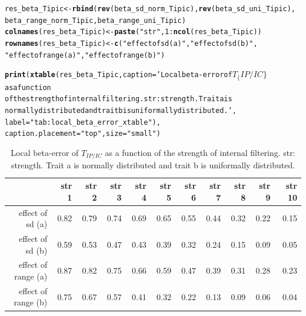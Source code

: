 \documentclass[12pt]{article}\usepackage[]{graphicx}\usepackage[]{color}
\makeatletter
\newcommand{\hlnum}[1]{\textcolor[rgb]{0.686,0.059,0.569}{#1}}%
\newcommand{\hlstr}[1]{\textcolor[rgb]{0.192,0.494,0.8}{#1}}%
\newcommand{\hlopt}[1]{\textcolor[rgb]{0,0,0}{#1}}%
\newcommand{\hlstd}[1]{\textcolor[rgb]{0.345,0.345,0.345}{#1}}%
\newcommand{\hlkwb}[1]{\textcolor[rgb]{0.69,0.353,0.396}{#1}}%
\newcommand{\hlkwc}[1]{\textcolor[rgb]{0.333,0.667,0.333}{#1}}%
\newcommand{\hlkwd}[1]{\textcolor[rgb]{0.737,0.353,0.396}{\textbf{#1}}}%
\newenvironment{kframe}{%
 \def\at@end@of@kframe{}%
 \ifinner\ifhmode%
  \def\at@end@of@kframe{\end{minipage}}%
  \begin{minipage}{\columnwidth}%
 \fi\fi%
 \def\FrameCommand##1{\hskip\@totalleftmargin \hskip-\fboxsep
 \colorbox{shadecolor}{##1}\hskip-\fboxsep
     \hskip-\linewidth \hskip-\@totalleftmargin \hskip\columnwidth}%
 \MakeFramed {\advance\hsize-\width
   \@totalleftmargin\z@ \linewidth\hsize
   \@setminipage}}%
 {\par\unskip\endMakeFramed%
 \at@end@of@kframe}
\newenvironment{knitrout}{}{} %
\makeatother
\begin{document}
\begin{knitrout}
\begin{kframe}
\begin{alltt}
\hlstd{res_beta_Tipic} \hlkwb{<-} \hlkwd{rbind}\hlstd{(}\hlkwd{rev}\hlstd{(beta_sd_norm_Tipic),} \hlkwd{rev}\hlstd{(beta_sd_uni_Tipic),}
      \hlstd{beta_range_norm_Tipic, beta_range_uni_Tipic)}
\hlkwd{colnames}\hlstd{(res_beta_Tipic)} \hlkwb{<-} \hlkwd{paste}\hlstd{(}\hlstr{"str"}\hlstd{,} \hlnum{1}\hlopt{:}\hlkwd{ncol}\hlstd{(res_beta_Tipic))}
\hlkwd{rownames}\hlstd{(res_beta_Tipic)} \hlkwb{<-} \hlkwd{c}\hlstd{(}\hlstr{"effect of sd (a)"}\hlstd{,} \hlstr{"effect of sd (b)"}\hlstd{,}
        \hlstr{"effect of range (a)"}\hlstd{,} \hlstr{"effect of range (b)"}\hlstd{)}
\end{alltt}
\end{kframe}
\end{knitrout}

\begin{kframe}
\begin{alltt}
\hlkwd{print}\hlstd{(}\hlkwd{xtable}\hlstd{(res_beta_Tipic,} \hlkwc{caption} \hlstd{=} \hlstr{'Local beta-error of $T_\{IP/IC\}$ as a function 
             of the strength of internal filtering. str: strength. Trait a is 
             normally distributed and trait b is uniformally distributed.'}\hlstd{,}
             \hlkwc{label} \hlstd{=} \hlstr{"tab:local_beta_error_xtable"}\hlstd{),}
      \hlkwc{caption.placement} \hlstd{=} \hlstr{"top"}\hlstd{,} \hlkwc{size} \hlstd{=} \hlstr{"small"}\hlstd{)}
\end{alltt}
\end{kframe}%
\begin{table}[ht]
\centering
\caption{Local beta-error of $T_{IP/IC}$ as a function 
             of the strength of internal filtering. str: strength. Trait a is 
             normally distributed and trait b is uniformally distributed.} 
\label{tab:local_beta_error_xtable}
{\small
\begin{tabular}{rrrrrrrrrrr}
  \hline
 & str 1 & str 2 & str 3 & str 4 & str 5 & str 6 & str 7 & str 8 & str 9 & str 10 \\ 
  \hline
effect of sd (a) & 0.82 & 0.79 & 0.74 & 0.69 & 0.65 & 0.55 & 0.44 & 0.32 & 0.22 & 0.15 \\ 
  effect of sd (b) & 0.59 & 0.53 & 0.47 & 0.43 & 0.39 & 0.32 & 0.24 & 0.15 & 0.09 & 0.05 \\ 
  effect of range (a) & 0.87 & 0.82 & 0.75 & 0.66 & 0.59 & 0.47 & 0.39 & 0.31 & 0.28 & 0.23 \\ 
  effect of range (b) & 0.75 & 0.67 & 0.57 & 0.41 & 0.32 & 0.22 & 0.13 & 0.09 & 0.06 & 0.04 \\ 
   \hline
\end{tabular}
}
\end{table}
\end{document}
